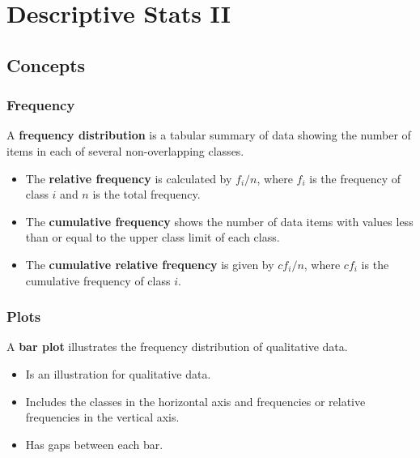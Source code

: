 \documentclass[
  letterpaper,
  DIV=11,
  numbers=noendperiod]{scrreprt}
\providecommand{\tightlist}{%
  \setlength{\itemsep}{0pt}\setlength{\parskip}{0pt}}\usepackage{longtable,booktabs,array}
\begin{document}
\hypertarget{descriptive-stats-ii}{%
\chapter{Descriptive Stats II}\label{descriptive-stats-ii}}

\hypertarget{concepts-1}{%
\section{Concepts}\label{concepts-1}}

\hypertarget{frequency}{%
\subsection*{Frequency}\label{frequency}}

A \textbf{frequency distribution} is a tabular summary of data showing
the number of items in each of several non-overlapping classes.

\begin{itemize}
\tightlist
\item
  The \textbf{relative frequency} is calculated by \(f_{i}/n\), where
  \(f_{i}\) is the frequency of class \(i\) and \(n\) is the total
  frequency.
\item
  The \textbf{cumulative frequency} shows the number of data items with
  values less than or equal to the upper class limit of each class.
\item
  The \textbf{cumulative relative frequency} is given by \(cf_{i}/n\),
  where \(cf_{i}\) is the cumulative frequency of class \(i\).
\end{itemize}

\hypertarget{plots}{%
\subsection*{Plots}\label{plots}}

A \textbf{bar plot} illustrates the frequency distribution of
qualitative data.

\begin{itemize}
\item
  Is an illustration for qualitative data.
\item
  Includes the classes in the horizontal axis and frequencies or
  relative frequencies in the vertical axis.
\item
  Has gaps between each bar.
\end{itemize}
\end{document}
